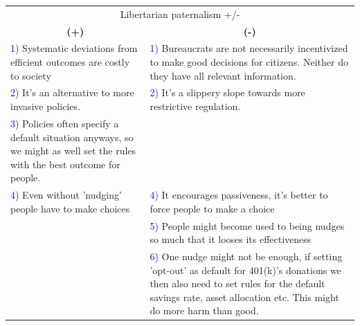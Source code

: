 \documentclass[12pt, a4paper]{article}
\begin{document}
\pagebreak
\footnotesize
\begin{table}[]
\centering
\begin{tabular}{@{}p{8cm}p{8cm}@{}}
\toprule
\multicolumn{2}{c}{Libertarian paternalism +/-}                                                                                                                                                                                                            \\ 
\multicolumn{1}{c}{\textbf{(+)}}                                                                                                   & \multicolumn{1}{c}{\textbf{(-)}}                                                                                                            \\ \midrule
\textcolor{blue}{1)} Systematic deviations from efficient outcomes are costly to society                                                     & \textcolor{blue}{1)} Bureaucrats are not necessarily incentivized to make good decisions for citizens. Neither do they have all relevant information. \\
\textcolor{blue}{2)} It's an alternative to more invasive policies.                                                                          & \textcolor{blue}{2)} It's a slippery slope towards more restrictive regulation.                                                                       \\
\textcolor{blue}{3)} Policies often specify a default situation anyways, so we might as well set the rules with the best outcome for people. &                                                                                                                                  \\ 
\textcolor{blue}{4)} Even without 'nudging' people have to make choices & \textcolor{blue}{4)} It encourages passiveness, it's better to force people to make a choice
\\
  & \textcolor{blue}{5)} People might become used to being nudges so much that it looses its effectiveness 
\\
  & \textcolor{blue}{6)} One nudge might not be enough, if setting 'opt-out' as default for 401(k)'s donations we then also need to set rules for the default savings rate, asset allocation etc. This might do more harm than good.
\\
\bottomrule
\end{tabular}
\end{table}
\normalsize
\end{document}

